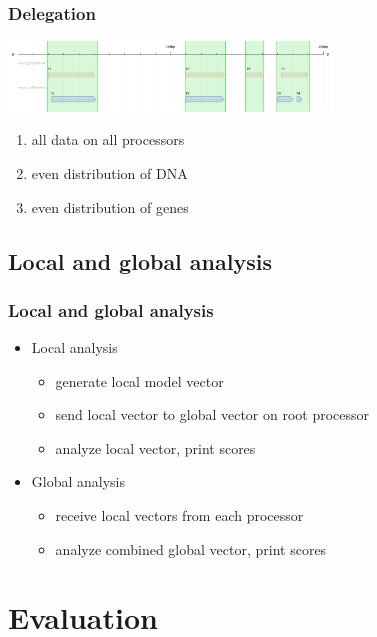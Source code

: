 \documentclass{beamer}
\begin{document}
\begin{frame}
  \frametitle{Delegation}
  \begin{center}
    \includegraphics[width=325px]{data.png}
  \end{center}
  \begin{enumerate}
    \item<2-> all data on all processors
    \item<3-> even distribution of DNA
    \item<4-> even distribution of genes
  \end{enumerate}
\end{frame}

\subsection{Local and global analysis}
\begin{frame}
  \frametitle{Local and global analysis}
  \begin{itemize}
    \item<1-> Local analysis
    \begin{itemize}
      \item<2-> generate local model vector
      \item<3-> send local vector to global vector on root processor
      \item<4-> analyze local vector, print scores
    \end{itemize}
    \item<1-> Global analysis
      \begin{itemize}
        \item<5-> receive local vectors from each processor
        \item<6-> analyze combined global vector, print scores
      \end{itemize}
  \end{itemize}
\end{frame}

\section{Evaluation}
\end{document}

